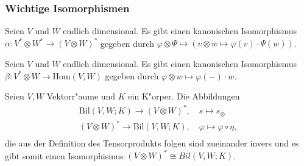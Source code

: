 \documentclass[9pt, a4paper, twocolumn, landscape]{article}
\begin{document}
\subsubsection{Wichtige Isomorphismen}

\begin{theorem}
Seien $V$ und $W$ endlich dimensional. Es gibt einen kanonischen Isomorphismus $\alpha : V^* \otimes W^* \rightarrow (V \otimes W)^*$ gegeben durch $\varphi \otimes \Psi \mapsto \left( v \otimes w \mapsto \varphi(v) \cdot \Psi(w)\right) $.
\end{theorem}

\begin{theorem}
Seien $V$ und $W$ endlich dimensional. Es gibt einen kanonischen Isomorphismus $\beta : V^* \otimes W \rightarrow \mathrm{Hom}(V, W)$ gegeben durch $\varphi \otimes w \mapsto \varphi (-) \cdot w$.
\end{theorem}

\begin{theorem}
Seien $V, W$ Vektorr"aume und $K$ ein K"orper. Die Abbildungen 
\begin{gather*}
\mathrm{Bil}(V, W; K) \rightarrow (V \otimes W)^*, \quad s \mapsto s_\otimes \\ 
(V \otimes W)^* \rightarrow \mathrm{Bil}(V, W; K) , \quad \varphi \mapsto \varphi \circ \eta,  \\  
\end{gather*}
die aus der Definition des Tensorprodukts folgen sind zueinander invers und es gibt somit einen Isomorphismus $(V \otimes W)^* \cong Bil(V, W; K)$.
\end{theorem}
\end{document}
